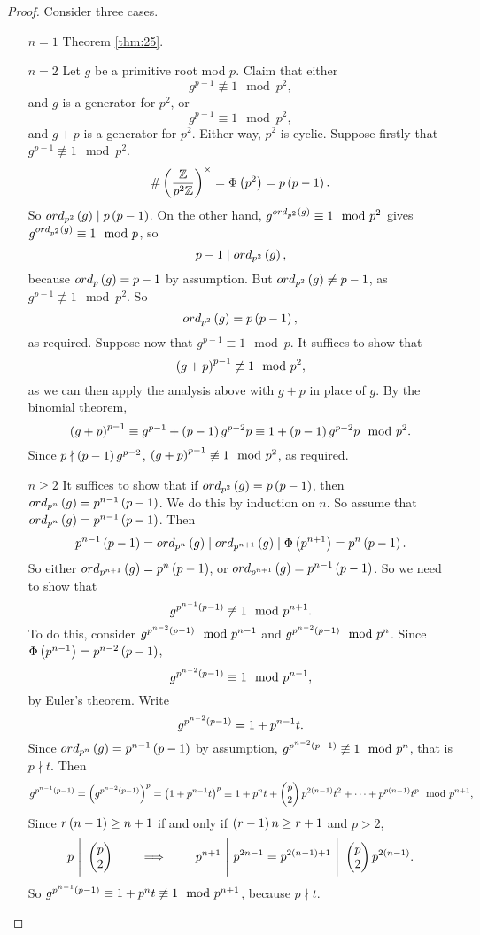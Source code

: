 \begin{proof}
Consider three cases.
\begin{itemize}[leftmargin=0.5in]
\item[$ n = 1 $] Theorem \ref{thm:25}.
\item[$ n = 2 $] Let $ g $ be a primitive root mod $ p $. Claim that either
$$ g^{p - 1} \not\equiv 1 \mod p^2, $$
and $ g $ is a generator for $ \unit{p^2} $, or
$$ g^{p - 1} \equiv 1 \mod p^2, $$
and $ g + p $ is a generator for $ \unit{p^2} $. Either way, $ \unit{p^2} $ is cyclic. Suppose firstly that $ g^{p - 1} \not\equiv 1 \mod p^2 $.
$$ \#\left( \dfrac{\mathbb{Z}}{p^2\mathbb{Z}} \right)^\times = \Phi\left( p^2 \right) = p\left( p - 1 \right). $$
So $ ord_{p^2}\left( g \right) \mid p\left( p - 1 \right) $. On the other hand, $ g^{ord_{p^2}\left( g \right)} \equiv 1 \mod p^2 $ gives $ g^{ord_{p^2}\left( g \right)} \equiv 1 \mod p $, so
$$ p - 1 \mid ord_{p^2}\left( g \right), $$
because $ ord_p\left( g \right) = p - 1 $ by assumption. But $ ord_{p^2}\left( g \right) \ne p - 1 $, as $ g^{p - 1} \not\equiv 1 \mod p^2 $. So
$$ ord_{p^2}\left( g \right) = p\left( p - 1 \right), $$
as required. Suppose now that $ g^{p - 1} \equiv 1 \mod p $. It suffices to show that
$$ \left( g + p \right)^{p - 1} \not\equiv 1 \mod p^2, $$
as we can then apply the analysis above with $ g + p $ in place of $ g $. By the binomial theorem,
$$ \left( g + p \right)^{p - 1} \equiv g^{p - 1} + \left( p - 1 \right)g^{p - 2}p \equiv 1 + \left( p - 1 \right)g^{p - 2}p \mod p^2. $$
Since $ p \nmid \left( p - 1 \right)g^{p - 2} $, $ \left( g + p \right)^{p - 1} \not\equiv 1 \mod p^2 $, as required.
\item[$ n \ge 2 $] It suffices to show that if $ ord_{p^2}\left( g \right) = p\left( p - 1 \right) $, then $ ord_{p^n}\left( g \right) = p^{n - 1}\left( p - 1 \right) $. We do this by induction on $ n $. So assume that $ ord_{p^n}\left( g \right) = p^{n - 1}\left( p - 1 \right) $. Then
$$ p^{n - 1}\left( p - 1 \right) = ord_{p^n}\left( g \right) \mid ord_{p^{n + 1}}\left( g \right) \mid \Phi\left( p^{n + 1} \right) = p^n\left( p - 1 \right). $$
So either $ ord_{p^{n + 1}}\left( g \right) = p^n\left( p - 1 \right) $, or $ ord_{p^{n + 1}}\left( g \right) = p^{n - 1}\left( p - 1 \right) $. So we need to show that
$$ g^{p^{n - 1}\left( p - 1 \right)} \not\equiv 1 \mod p^{n + 1}. $$
To do this, consider $ g^{p^{n - 2}\left( p - 1 \right)} \mod p^{n - 1} $ and $ g^{p^{n - 2}\left( p - 1 \right)} \mod p^n $. Since $ \Phi\left( p^{n - 1} \right) = p^{n - 2}\left( p - 1 \right) $,
$$ g^{p^{n - 2}\left( p - 1 \right)} \equiv 1 \mod p^{n - 1}, $$
by Euler's theorem. Write
$$ g^{p^{n - 2}\left( p - 1 \right)} = 1 + p^{n - 1}t. $$
Since $ ord_{p^n}\left( g \right) = p^{n - 1}\left( p - 1 \right) $ by assumption, $ g^{p^{n - 2}\left( p - 1 \right)} \not\equiv 1 \mod p^n $, that is $ p \nmid t $. Then
$$ g^{p^{n - 1}\left( p - 1 \right)} = \left( g^{p^{n - 2}\left( p - 1 \right)} \right)^p = \left( 1 + p^{n - 1}t \right)^p \equiv 1 + p^nt + \begin{pmatrix} p \\ 2 \end{pmatrix}p^{2\left( n - 1 \right)}t^2 + \dots + p^{p\left( n - 1 \right)}t^p \mod p^{n + 1}, $$
Since $ r\left( n - 1 \right) \ge n + 1 $ if and only if $ \left( r - 1 \right)n \ge r + 1 $ and $ p > 2 $,
$$ p \ \Bigg| \ \two{p}{2} \qquad \implies \qquad p^{n + 1} \ \Bigg| \ p^{2n - 1} = p^{2\rb{n - 1} + 1} \ \Bigg| \ \two{p}{2}p^{2\rb{n - 1}}. $$
So $ g^{p^{n - 1}\left( p - 1 \right)} \equiv 1 + p^nt \not\equiv 1 \mod p^{n + 1} $, because $ p \nmid t $.
\end{itemize}
\end{proof}

